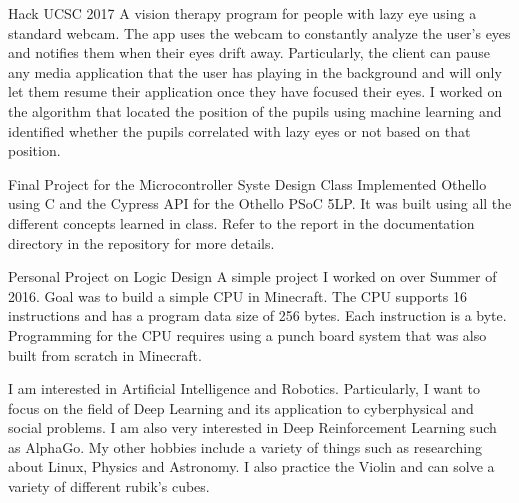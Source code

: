 \documentclass{resume}
\begin{document}
{Hack UCSC 2017}
{A vision therapy program for people with lazy eye using a standard 
webcam. The app uses the webcam to constantly analyze the user's eyes 
and notifies them when their eyes drift away. Particularly, the client
can pause any media application that the user has playing in the 
background and will only let them resume their application once they 
have focused their eyes. I worked on the algorithm that located the
position of the pupils using machine learning and identified whether
the pupils correlated with lazy eyes or not based on that position.}

{Final Project for the Microcontroller Syste Design Class}
{Implemented Othello using C and the Cypress API for the Othello PSoC 5LP.
It was built using all the different concepts learned in class. Refer to the
report in the documentation directory in the repository for more details.}

{Personal Project on Logic Design}
{A simple project I worked on over Summer of 2016. Goal was to build a simple
CPU in Minecraft. The CPU supports 16 instructions and has a program data
size of 256 bytes. Each instruction is a byte. Programming for the CPU
requires using a punch board system that was also built from scratch in
Minecraft.}

I am interested in Artificial Intelligence and Robotics. Particularly,
I want to focus on the field of Deep Learning and its application to
cyberphysical and social problems. I am also very interested in 
Deep Reinforcement Learning such as AlphaGo. My other hobbies include a variety
of things such as researching about Linux, Physics and Astronomy. I
also practice the Violin and can solve a variety of different rubik's
cubes.
\end{document}
